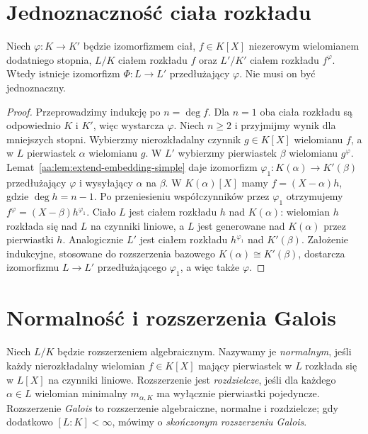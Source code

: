 \section{Jednoznaczność ciała rozkładu}
\begin{twierdzenie}
\label{aa:tw:splitting-uniqueness}
Niech $\varphi:K\to K'$ będzie izomorfizmem ciał,
$f\in K[X]$ niezerowym wielomianem dodatniego stopnia,
$L/K$ ciałem rozkładu $f$ oraz $L'/K'$ ciałem rozkładu
$f^\varphi$. Wtedy istnieje izomorfizm $\Phi:L\to L'$
przedłużający $\varphi$. Nie musi on być jednoznaczny.
\end{twierdzenie}
\begin{proof}
Przeprowadzimy indukcję po $n=\deg f$. Dla $n=1$
oba ciała rozkładu są odpowiednio $K$ i $K'$, więc
wystarcza $\varphi$. Niech $n\ge2$ i przyjmijmy wynik
dla mniejszych stopni. Wybierzmy nierozkładalny czynnik
$g\in K[X]$ wielomianu $f$, a w $L$ pierwiastek
$\alpha$ wielomianu $g$. W $L'$ wybierzmy pierwiastek
$\beta$ wielomianu $g^\varphi$.
Lemat~\ref{aa:lem:extend-embedding-simple} daje
izomorfizm $\varphi_1:K(\alpha)\to K'(\beta)$
przedłużający $\varphi$ i wysyłający $\alpha$ na $\beta$.
W $K(\alpha)[X]$ mamy $f=(X-\alpha)h$,
gdzie $\deg h=n-1$. Po przeniesieniu współczynników
przez $\varphi_1$ otrzymujemy
$f^\varphi=(X-\beta)h^{\varphi_1}$.
Ciało $L$ jest ciałem rozkładu $h$ nad $K(\alpha)$:
wielomian $h$ rozkłada się nad $L$ na czynniki liniowe,
a $L$ jest generowane nad $K(\alpha)$ przez pierwiastki $h$. Analogicznie $L'$ jest ciałem
rozkładu $h^{\varphi_1}$ nad $K'(\beta)$.
Założenie indukcyjne, stosowane do rozszerzenia bazowego
$K(\alpha)\cong K'(\beta)$, dostarcza izomorfizmu $L\to L'$
przedłużającego $\varphi_1$, a więc także $\varphi$.
\end{proof}

\section{Normalność i rozszerzenia Galois}
\begin{definicja}
\label{aa:def:normal-separable-galois}
Niech $L/K$ będzie rozszerzeniem algebraicznym.
Nazywamy je \emph{normalnym}, jeśli każdy nierozkładalny
wielomian $f\in K[X]$ mający pierwiastek w $L$
rozkłada się w $L[X]$ na czynniki liniowe.
Rozszerzenie jest \emph{rozdzielcze}, jeśli dla każdego
$\alpha\in L$ wielomian minimalny $m_{\alpha,K}$
ma wyłącznie pierwiastki pojedyncze.
Rozszerzenie \emph{Galois} to rozszerzenie algebraiczne,
normalne i rozdzielcze; gdy dodatkowo $[L:K]<\infty$,
mówimy o \emph{skończonym rozszerzeniu Galois}.
\end{definicja}

